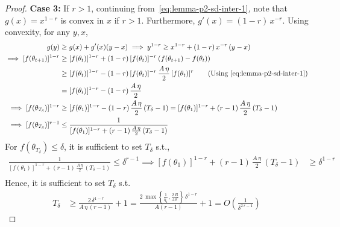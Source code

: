 \documentclass[10pt,a4paper]{amsart}
\newcommand{\tht}{\theta_t}
\newcommand{\thtt}{\theta_{t+1}}
\begin{document}
\begin{proof}
\textbf{Case 3:} If $r > 1$, continuing from~\cref{eq:lemma-p2-sd-inter-1}, note that $g(x) = x^{1-r}$ is convex in $x$ if $r > 1$. Furthermore, $g'(x) = (1-r) \, x^{-r}$. Using convexity, for any $y, x$, 
\begin{align*}
g(y) & \geq g(x) + g'(x) (y - x) \implies y^{1 - r} \geq x^{1 - r} +  (1-r) \, x^{-r} \, (y - x) \\
\implies [f(\thtt)]^{1 - r} & \geq [f(\tht)]^{1-r} + (1-r) \, [f(\tht)]^{-r} \, (f(\thtt) - f(\tht)) \\
& \geq [f(\tht)]^{1-r} - (1-r) \, [f(\tht)]^{-r} \,  \frac{A \, \eta}{2} \,  [f(\tht)]^r \tag{Using~\cref{eq:lemma-p2-sd-inter-1}} \\
& = [f(\tht)]^{1-r} - (1-r) \, \frac{A \, \eta}{2} \\
\implies [f(\theta_{T_\delta})]^{1 - r} & \geq [f(\theta_1)]^{1-r} - (1-r) \, \frac{A \, \eta}{2} \, (T_\delta -1) =  [f(\theta_1)]^{1-r} + (r-1) \, \frac{A \, \eta}{2} \, (T_\delta-1)\\
\implies [f(\theta_{T_\delta})]^{r - 1} & \leq \frac{1}{  [f(\theta_1)]^{1-r} + (r-1) \, \frac{A \, \eta}{2} \, (T_\delta-1)}
\end{align*}
For $f(\theta_{T_\delta}) \leq \delta$, it is sufficient to set $T_\delta$ s.t., 
\begin{align*}
\frac{1}{  [f(\theta_1)]^{1-r} + (r-1) \, \frac{A \, \eta}{2} \, (T_\delta-1)} \leq \delta^{r-1} \implies
[f(\theta_1)]^{1-r} + (r-1) \, \frac{A \, \eta}{2} \, (T_\delta-1)  & \geq  \delta^{1-r}  \\
\end{align*}
Hence, it is sufficient to set $T_\delta$ s.t. 
\begin{align*}
T_{\delta} & \geq \frac{2\, \delta^{1-r}}{A \, \eta \, (r-1) \, } + 1 = \frac{2 \, \max\left\{\frac{1}{\bar{\eta}_1}, \frac{2 \, B}{A \delta^r}\right\}\, \delta^{1-r}}{A (r-1)  } + 1  = O \left( \frac{1}{\delta^{2 \, r - 1}} \right)
\end{align*}


\end{proof}
\end{document}
